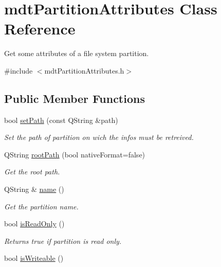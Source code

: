 \hypertarget{classmdt_partition_attributes}{
\section{mdtPartitionAttributes Class Reference}
\label{classmdt_partition_attributes}
}


Get some attributes of a file system partition.  




{\ttfamily \#include $<$mdtPartitionAttributes.h$>$}

\subsection*{Public Member Functions}
\begin{DoxyCompactItemize}
\item 
bool \hyperlink{classmdt_partition_attributes_a2d8e383af725587f0144f573da0f2bd3}{setPath} (const QString \&path)
\begin{DoxyCompactList}\small\item\em Set the path of partition on wich the infos must be retreived. \end{DoxyCompactList}\item 
QString \hyperlink{classmdt_partition_attributes_ad9b5b813fc9c8ae00f602864903af9fb}{rootPath} (bool nativeFormat=false)
\begin{DoxyCompactList}\small\item\em Get the root path. \end{DoxyCompactList}\item 
QString \& \hyperlink{classmdt_partition_attributes_a365cb772d258e6752728fb66d089b31f}{name} ()
\begin{DoxyCompactList}\small\item\em Get the partition name. \end{DoxyCompactList}\item 
\hypertarget{classmdt_partition_attributes_ae719e29cf5e5b136ca282aab5acec36e}{
bool \hyperlink{classmdt_partition_attributes_ae719e29cf5e5b136ca282aab5acec36e}{isReadOnly} ()}
\label{classmdt_partition_attributes_ae719e29cf5e5b136ca282aab5acec36e}

\begin{DoxyCompactList}\small\item\em Returns true if partition is read only. \end{DoxyCompactList}\item 
\hypertarget{classmdt_partition_attributes_aacfef3893dfe85e504996dd9cd6038dd}{
bool \hyperlink{classmdt_partition_attributes_aacfef3893dfe85e504996dd9cd6038dd}{isWriteable} ()}
\label{classmdt_partition_attributes_aacfef3893dfe85e504996dd9cd6038dd}


\end{DoxyCompactItemize}
